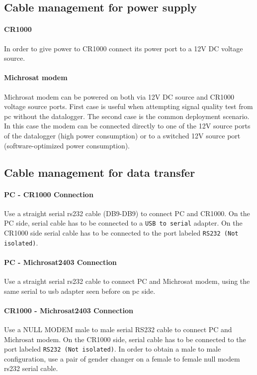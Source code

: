 \subsection{Cable management for power supply}
\paragraph{CR1000}
In order to give power to CR1000 connect its power port to a 12V DC voltage source.
\paragraph{Michrosat modem}
Michrosat modem can be powered on both via 12V DC source and CR1000 voltage source ports. First case is useful when attempting signal quality test from pc without the datalogger.
The second case is the common deployment scenario. In this case the modem can be connected directly to one of the 12V source ports of the datalogger (high power consumption) or to a switched 12V source port (software-optimized power consumption).
\subsection{Cable management for data transfer}
\label{subsec:datacable}
\paragraph{PC - CR1000 Connection}
Use a straight serial rs232 cable (DB9-DB9) to connect PC and CR1000. On the PC side, serial cable has to be connected to a {\tt USB to serial} adapter. On the CR1000 side serial cable has to be connected to the port labeled {\tt RS232 (Not isolated)}.
\paragraph{PC - Michrosat2403 Connection}
Use a straight serial rs232 cable to connect PC and Michrosat modem, using the same serial to usb adapter seen before on pc side.
\paragraph{CR1000 - Michrosat2403 Connection}
Use a NULL MODEM male to male serial RS232 cable to connect PC and Michrosat modem. On the CR1000 side, serial cable has to be connected to the port labeled {\tt RS232 (Not isolated)}. In order to obtain a male to male configuration, use a pair of gender changer on a female to female null modem rs232 serial cable.